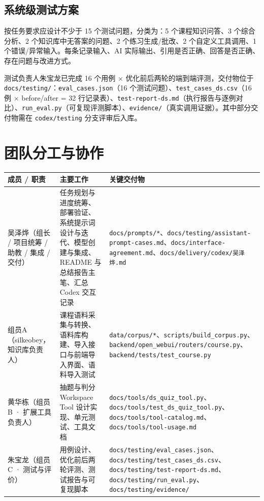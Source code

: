 \documentclass[12pt,a4paper]{ctexart}
\begin{document}
\subsection{系统级测试方案}

按任务要求应设计不少于 15 个测试问题，分类为：5 个课程知识问答、3 个综合分析、2 个知识库中无答案的问题、2 个练习生成/批改、2 个自定义工具调用、1 个错误/异常输入。每条记录输入、AI 实际输出、引用是否正确、回答是否正确、存在问题与改进方式。

测试负责人朱宝龙已完成 16 个用例 × 优化前后两轮的端到端评测，交付物位于 \texttt{docs/testing/}：\texttt{eval\_cases.json}（16 个测试问题）、\texttt{test\_cases\_ds.csv}（16 例 × before/after = 32 行记录表）、\texttt{test-report-ds.md}（执行报告与逐例对比）、\texttt{run\_eval.py}（可复现评测脚本）、\texttt{evidence/}（真实调用证据）。其中部分交付物需在 \texttt{codex/testing} 分支评审后入库。

\section{团队分工与协作}

\begin{longtable}{>{\raggedright\arraybackslash}p{4.2cm}>{\raggedright\arraybackslash}p{6.3cm}>{\raggedright\arraybackslash}p{5.5cm}}
\toprule
\textbf{成员 / 职责} & \textbf{主要工作} & \textbf{关键交付物} \\
\midrule
\endhead
吴泽烨（组长 / 项目统筹 / 助教 / 集成 / 交付） & 任务规划与进度统筹、部署验证、系统提示词设计与迭代、模型创建与集成、README 与总结报告主笔、汇总 Codex 交互记录 & \texttt{docs/prompts/*}、\texttt{docs/testing/assistant-prompt-cases.md}、\texttt{docs/interface-agreement.md}、\texttt{docs/delivery/codex/吴泽烨.md} \\
\midrule
组员A（silkeobey，知识库负责人） & 课程语料采集与转换、语料库构建、导入接口与前端导入界面、语料导入测试 & \texttt{data/corpus/*}、\texttt{scripts/build\_corpus.py}、\texttt{backend/open\_webui/routers/course.py}、\texttt{backend/tests/test\_course.py} \\
\midrule
黄华栋（组员B · 扩展工具负责人） & 抽题与判分 Workspace Tool 设计实现、单元测试、工具文档 & \texttt{docs/tools/ds\_quiz\_tool.py}、\texttt{docs/tools/test\_ds\_quiz\_tool.py}、\texttt{docs/tools/tool-catalog.md}、\texttt{docs/tools/tool-usage.md} \\
\midrule
朱宝龙（组员C · 测试与评价） & 16 用例设计、优化前后两轮评测、测试报告与可复现脚本 & \texttt{docs/testing/eval\_cases.json}、\texttt{docs/testing/test\_cases\_ds.csv}、\texttt{docs/testing/test-report-ds.md}、\texttt{docs/testing/run\_eval.py}、\texttt{docs/testing/evidence/} \\
\bottomrule
\end{longtable}
\end{document}

